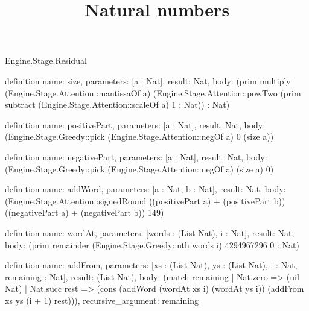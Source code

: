 \begin{lexlean}{Engine.Stage.Residual}
\title{Natural numbers}
\begin{semanticmodule}
definition{
  name: size,
  parameters: [a : Nat],
  result: Nat,
  body: (prim multiply (Engine.Stage.Attention::mantissaOf a) (Engine.Stage.Attention::powTwo (prim subtract (Engine.Stage.Attention::scaleOf a) 1 : Nat)) : Nat)
}

definition{
  name: positivePart,
  parameters: [a : Nat],
  result: Nat,
  body: (Engine.Stage.Greedy::pick (Engine.Stage.Attention::negOf a) 0 (size a))
}

definition{
  name: negativePart,
  parameters: [a : Nat],
  result: Nat,
  body: (Engine.Stage.Greedy::pick (Engine.Stage.Attention::negOf a) (size a) 0)
}

definition{
  name: addWord,
  parameters: [a : Nat, b : Nat],
  result: Nat,
  body: (Engine.Stage.Attention::signedRound ((positivePart a) + (positivePart b)) ((negativePart a) + (negativePart b)) 149)
}

definition{
  name: wordAt,
  parameters: [words : (List Nat), i : Nat],
  result: Nat,
  body: (prim remainder (Engine.Stage.Greedy::nth words i) 4294967296 0 : Nat)
}

definition{
  name: addFrom,
  parameters: [xs : (List Nat), ys : (List Nat), i : Nat, remaining : Nat],
  result: (List Nat),
  body: (match remaining
    | Nat.zero => (nil Nat)
    | Nat.succ rest => (cons (addWord (wordAt xs i) (wordAt ys i)) (addFrom xs ys (i + 1) rest))),
  recursive_argument: remaining
}
\end{semanticmodule}
\end{lexlean}
